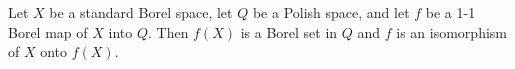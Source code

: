 Let $X$ be a standard Borel space, let $Q$ be a Polish space, and let $f$ be a 1-1 Borel map of $X$ into $Q$. Then $f(X)$ is a Borel set in $Q$ and $f$ is an isomorphism of $X$ onto $f(X)$.
